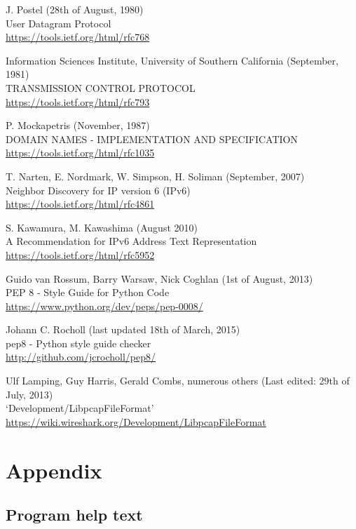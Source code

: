 \documentclass[10pt,a4paper,notitlepage]{report}
\begin{document}
\begin{thebibliography}{99}
	J. Postel (28th of August, 1980)\\
	User Datagram Protocol\\
	\url{https://tools.ietf.org/html/rfc768}

	Information Sciences Institute, University of Southern California (September, 1981)\\
	TRANSMISSION CONTROL PROTOCOL\\
	\url{https://tools.ietf.org/html/rfc793}

	P. Mockapetris (November, 1987)\\
	DOMAIN NAMES - IMPLEMENTATION AND SPECIFICATION\\
	\url{https://tools.ietf.org/html/rfc1035}

	T. Narten, E. Nordmark, W. Simpson, H. Soliman (September, 2007)\\
	Neighbor Discovery for IP version 6 (IPv6)\\
	\url{https://tools.ietf.org/html/rfc4861}

	S. Kawamura, M. Kawashima (August 2010)\\
	A Recommendation for IPv6 Address Text Representation\\
	\url{https://tools.ietf.org/html/rfc5952}

	Guido van Rossum, Barry Warsaw, Nick Coghlan (1st of August, 2013)\\
	PEP 8 - Style Guide for Python Code\\
	\url{https://www.python.org/dev/peps/pep-0008/}
	
	Johann C. Rocholl (last updated 18th of March, 2015)\\
	pep8 - Python style guide checker\\
	\url{http://github.com/jcrocholl/pep8/}

	Ulf Lamping, Guy Harris, Gerald Combs, numerous others (Last edited: 29th of July, 2013)\\
	`Development/LibpcapFileFormat'\\
	\url{https://wiki.wireshark.org/Development/LibpcapFileFormat}

\end{thebibliography}

\chapter{Appendix}
\section{Program help text}
\label{sec:helptext}
\end{document}
